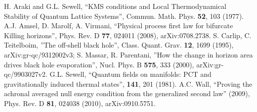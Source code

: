\documentclass{article}
\begin{document}
\begin{thebibliography}{99}
H. Araki and G.L. Sewell, ``KMS conditions and Local Thermodynamical Stability of Quantum Lattice Systems'', Commun. Math. Phys. \textbf{52}, 103 (1977).
A.J. Amsel, D. Marolf, A. Virmani, ``Physical process first law for bifurcate Killing horizons'', Phys. Rev. D \textbf{77}, 024011 (2008), arXiv:0708.2738.
S. Carlip, C. Teitelboim, ''The off-shell black hole'', Class. Quant. Grav. \textbf{12}, 1699 (1995), arXiv:gr-qc/9312002v3; S. Massar, R. Parentani, ''How the change in horizon area drives black hole evaporation'', Nucl. Phys. B \textbf{575}, 333 (2000), arXiv:gr-qc/9903027v2.
G.L. Sewell, ``Quantum fields on manifolds: PCT and gravitationally induced thermal states'', \textbf{141}, 201 (1981).
A.C. Wall, ``Proving the achronal averaged null energy condition from the generalized second law'' (2009), Phys. Rev. D \textbf{81}, 024038 (2010), arXiv:0910.5751. 
\end{thebibliography}
\end{document}
